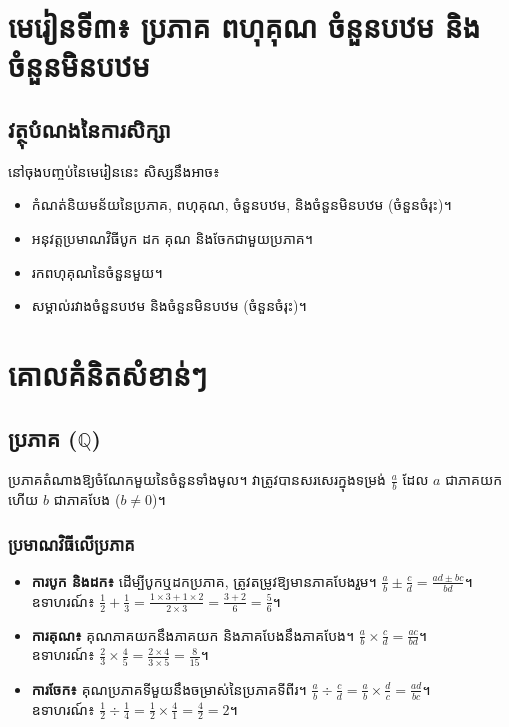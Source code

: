 \clearpage
\setcounter{section}{0}

\section*{មេរៀនទី៣៖ ប្រភាគ ពហុគុណ ចំនួនបឋម និងចំនួនមិនបឋម}

\subsection*{វត្ថុបំណងនៃការសិក្សា}
នៅចុងបញ្ចប់នៃមេរៀននេះ សិស្សនឹងអាច៖
\begin{itemize}[label=-]
    \item កំណត់និយមន័យនៃប្រភាគ, ពហុគុណ, ចំនួនបឋម, និងចំនួនមិនបឋម (ចំនួនចំរុះ)។
    \item អនុវត្តប្រមាណវិធីបូក ដក គុណ និងចែកជាមួយប្រភាគ។
    \item រកពហុគុណនៃចំនួនមួយ។
    \item សម្គាល់រវាងចំនួនបឋម និងចំនួនមិនបឋម (ចំនួនចំរុះ)។
\end{itemize}

\section{គោលគំនិតសំខាន់ៗ}

\subsection{ប្រភាគ ($\mathbb{Q}$)}
ប្រភាគតំណាងឱ្យចំណែកមួយនៃចំនួនទាំងមូល។ វាត្រូវបានសរសេរក្នុងទម្រង់ $\frac{a}{b}$ ដែល $a$ ជាភាគយក ហើយ $b$ ជាភាគបែង ($b \neq 0$)។

\subsubsection{ប្រមាណវិធីលើប្រភាគ}
\begin{itemize}[label=-]
    \item \textbf{ការបូក និងដក៖} ដើម្បីបូកឬដកប្រភាគ, ត្រូវតម្រូវឱ្យមានភាគបែងរួម។ $\frac{a}{b} \pm \frac{c}{d} = \frac{ad \pm bc}{bd}$។\\
    ឧទាហរណ៍៖ $\frac{1}{2} + \frac{1}{3} = \frac{1 \times 3 + 1 \times 2}{2 \times 3} = \frac{3+2}{6} = \frac{5}{6}$។
    \item \textbf{ការគុណ៖} គុណភាគយកនឹងភាគយក និងភាគបែងនឹងភាគបែង។ $\frac{a}{b} \times \frac{c}{d} = \frac{ac}{bd}$។\\
    ឧទាហរណ៍៖ $\frac{2}{3} \times \frac{4}{5} = \frac{2 \times 4}{3 \times 5} = \frac{8}{15}$។
    \item \textbf{ការចែក៖} គុណប្រភាគទីមួយនឹងចម្រាស់នៃប្រភាគទីពីរ។ $\frac{a}{b} \div \frac{c}{d} = \frac{a}{b} \times \frac{d}{c} = \frac{ad}{bc}$។\\
    ឧទាហរណ៍៖ $\frac{1}{2} \div \frac{1}{4} = \frac{1}{2} \times \frac{4}{1} = \frac{4}{2} = 2$។
\end{itemize}


